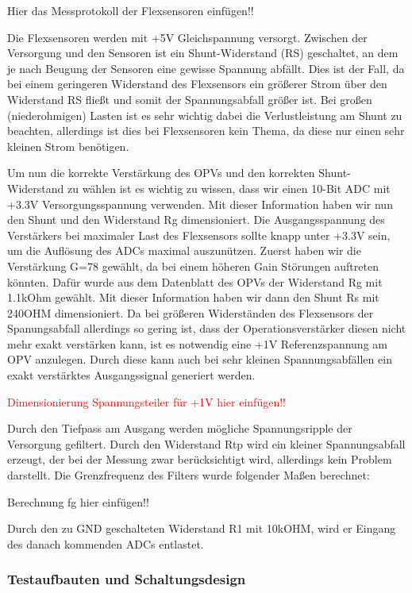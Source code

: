 \documentclass[11pt]{article}
\begin{document}
Hier das Messprotokoll der Flexsensoren einfügen!!

Die Flexsensoren werden mit +5V Gleichspannung versorgt. Zwischen der Versorgung und den Sensoren ist ein Shunt-Widerstand 
(RS) geschaltet, an dem je nach Beugung der Sensoren eine gewisse Spannung abfällt. Dies ist der Fall, da bei einem 
geringeren Widerstand des Flexsensors ein größerer Strom über den Widerstand RS fließt und somit der Spannungsabfall größer 
ist. Bei großen (niederohmigen) Lasten ist es sehr wichtig dabei die Verlustleistung am Shunt zu beachten, allerdings ist 
dies bei Flexsensoren kein Thema, da diese nur einen sehr kleinen Strom benötigen. 

Um nun die korrekte Verstärkung des OPVs und den korrekten Shunt-Widerstand zu wählen ist es wichtig zu wissen, dass wir 
einen 10-Bit ADC mit +3.3V Versorgungsspannung verwenden. Mit dieser Information haben wir nun den Shunt und den Widerstand 
Rg dimensioniert. Die Ausgangsspannung des Verstärkers bei maximaler Last des Flexsensors sollte knapp unter +3.3V sein, 
um die Auflösung des ADCs maximal auszunützen. Zuerst haben wir die Verstärkung G=78 gewählt, da bei einem höheren Gain 
Störungen auftreten könnten. Dafür wurde aus dem Datenblatt des OPVs der Widerstand Rg mit 1.1kOhm gewählt. Mit dieser 
Information haben wir dann den Shunt Rs mit 240OHM dimensioniert. Da bei größeren Widerständen des Flexsensors der 
Spanungsabfall allerdings so gering ist, dass der Operationsverstärker diesen nicht mehr exakt verstärken kann, ist es 
notwendig eine +1V Referenzspannung am OPV anzulegen. Durch diese kann auch bei sehr kleinen Spannungsabfällen ein exakt 
verstärktes Ausgangssignal generiert werden.

\textcolor{red}{Dimensionierung Spannungsteiler für +1V hier einfügen!!}


Durch den Tiefpass am Ausgang werden mögliche Spannungsripple der Versorgung gefiltert. Durch den Widerstand Rtp wird ein kleiner Spannungsabfall erzeugt, der bei der Messung zwar berücksichtigt wird, allerdings kein Problem darstellt. Die Grenzfrequenz des Filters wurde folgender Maßen berechnet:

Berechnung fg hier einfügen!!

Durch den zu GND geschalteten Widerstand R1 mit 10kOHM, wird er Eingang des danach kommenden ADCs entlastet. 

\subsubsection{Testaufbauten und Schaltungsdesign}
\end{document}
